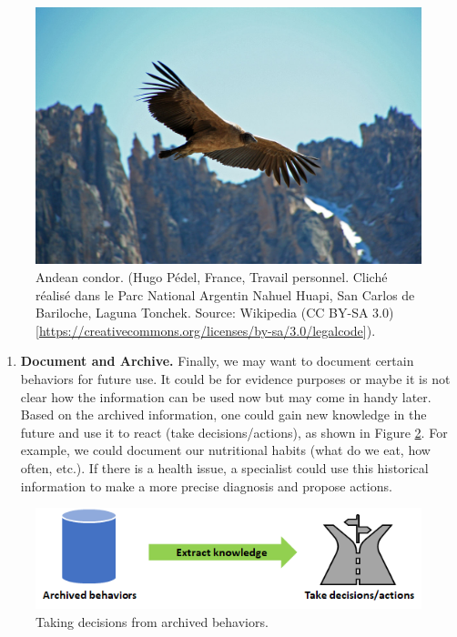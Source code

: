 \documentclass[
  11pt,
]{krantz}
\providecommand{\tightlist}{%
  \setlength{\itemsep}{0pt}\setlength{\parskip}{0pt}}
\begin{document}
\begin{figure}

{\centering \includegraphics[width=0.5\linewidth]{images/condor} 

}

\caption{Andean condor. (Hugo Pédel, France, Travail personnel. Cliché réalisé dans le Parc National Argentin Nahuel Huapi, San Carlos de Bariloche, Laguna Tonchek. Source: Wikipedia (CC BY-SA 3.0) {[}\url{https://creativecommons.org/licenses/by-sa/3.0/legalcode}{]}).}\label{fig:condor}
\end{figure}

\begin{enumerate}
\def\labelenumi{\arabic{enumi}.}
\setcounter{enumi}{2}
\tightlist
\item
  \textbf{Document and Archive.} Finally, we may want to document certain behaviors for future use. It could be for evidence purposes or maybe it is not clear how the information can be used now but may come in handy later. Based on the archived information, one could gain new knowledge in the future and use it to react (take decisions/actions), as shown in Figure \ref{fig:decisionsActions}. For example, we could document our nutritional habits (what do we eat, how often, etc.). If there is a health issue, a specialist could use this historical information to make a more precise diagnosis and propose actions.
\end{enumerate}

\begin{figure}

{\centering \includegraphics[width=0.7\linewidth]{images/decisions} 

}

\caption{Taking decisions from archived behaviors.}\label{fig:decisionsActions}
\end{figure}
\end{document}
